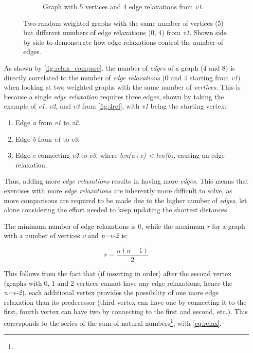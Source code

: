 \documentclass{l4proj}
\begin{document}
\begin{figure}
\begin{subfigure}[b]{0.49\textwidth}
        \caption{Graph with 5 vertices and 4 edge relaxations from \emph{v1}.}
        \label{fig:4rel}
    \end{subfigure}   
    \caption{Two random weighted graphs with the same number of vertices (5) but different numbers of edge relaxations (0, 4) from \emph{v1}. Shown side by side to demonstrate how edge relaxations control the number of edges. }\label{fig:relax_compare}
\end{figure}

As shown by \autoref{fig:relax_compare}, the number of \emph{edges} of a graph (4 and 8) is directly correlated to the number of \emph{edge relaxations} (0 and 4 starting from \emph{v1}) when looking at two weighted graphs with the same number of \emph{vertices}. This is because a single \emph{edge relaxation} requires three edges, shown by taking the example of \emph{v1}, \emph{v2}, and \emph{v3} from \autoref{fig:4rel}, with \emph{v1} being the starting vertex:
\begin{enumerate}
	\item
	Edge \emph{a} from \emph{v1} to \emph{v2}.
	\item
	Edge \emph{b} from \emph{v1} to \emph{v3}.
	\item
	Edge \emph{c} connecting \emph{v2} to \emph{v3}, where \emph{len(a+c) < len(b)}, causing an edge relaxation.
\end{enumerate}

Thus, adding more \emph{edge relaxations} results in having more \emph{edges}. This means that exercises with more \emph{edge relaxations} are inherently more difficult to solve, as more comparisons are required to be made due to the higher number of \emph{edges}, let alone considering the effort needed to keep updating the shortest distances. 

The minimum number of edge relaxations is 0, while the maximum \emph{r} for a graph with a number of vertices \emph{v} and \emph{n=v-2} is:

\begin{equation}
	\label{eq:relax}
	r = \frac{n (n + 1)}{2}
\end{equation}

This follows from the fact that (if inserting in order) after the second vertex (graphs with 0, 1 and 2 vertices cannot have any edge relaxations, hence the \emph{n=v-2}), each additional vertex provides the possibility of one more edge relaxation than its predecessor (third vertex can have one by connecting it to the first, fourth vertex can have two by connecting to the first and second, etc.). This corresponds to the series of the sum of natural numbers\footnote{}, with \autoref{eq:relax}.
\end{document}
